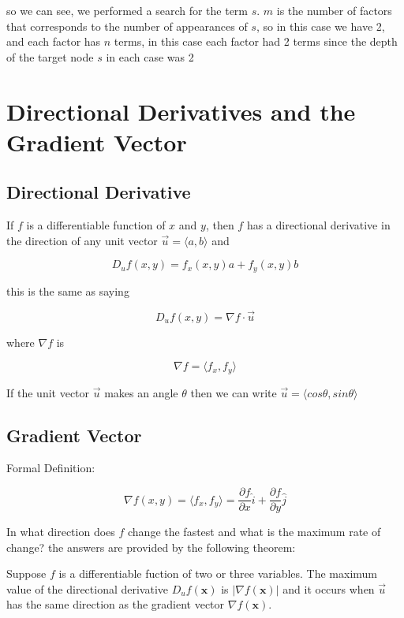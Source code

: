 \documentclass{article}
\begin{document}
so we can see, we performed a search for the term $s$. $m$ is the number of factors that corresponds to the number of appearances of $s$, so in this case we have 2, and each factor has $n$ terms, in this case each factor had 2 terms since the depth of the target node $s$ in each case was 2


\newpage
\section{Directional Derivatives and the Gradient Vector}

\subsection{Directional Derivative}

If $f$ is a differentiable function of $x$ and $y$, then $f$ has a directional derivative in the direction of any unit vector $\vec{u} = \langle a,b \rangle$ and

$$D_uf(x,y) = f_x(x,y)a + f_y(x,y)b$$

this is the same as saying

$$D_uf(x,y) = \nabla f \cdot \vec{u}$$

where $\nabla f$ is 

$$\nabla f  = \langle f_x, f_y \rangle$$

If the unit vector $\vec{u}$ makes an angle $\theta$ then we can write $\vec{u} = \langle cos \theta, sin \theta \rangle$

\subsection{Gradient Vector}


Formal Definition:

$$\nabla f(x,y) = \langle f_x, f_y \rangle = \frac{\partial f}{\partial x}\hat{i}+\frac{\partial f}{\partial y} \hat{j}$$

In what direction does $f$ change the fastest and what is the maximum rate of change? the answers are provided by the following theorem:

\begin{center}
    Suppose $f$ is a differentiable fuction of two or three variables. The maximum value of the directional derivative $D_uf(\mathbf{x}) $ is $\rvert \nabla f(\mathbf{x}) \rvert$ and it occurs when $\vec{u}$ has the same direction as the gradient vector $\nabla f(\mathbf{x})$.
\end{center}
\end{document}
